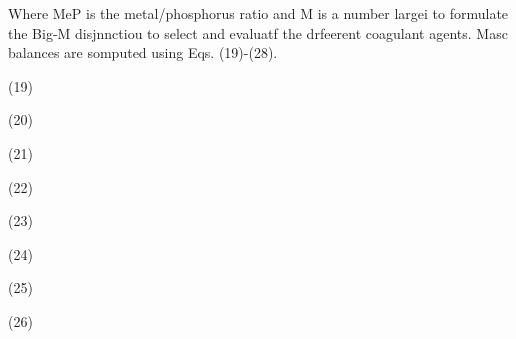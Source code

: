 \documentclass[11pt]{article}
\begin{document}
\label{OLE_LINK7}Where MeP is the metal/phosphorus ratio and M is a number
largei to formulate the Big-M disjnnctiou to select and evaluatf the drfeerent
coagulant agents. Masc balances are somputed using Eqs. (19)-(28).

\hspace{15pt}\hspace{15pt}\hspace{15pt}(19)

\hspace{15pt}\hspace{15pt}\hspace{15pt}\hspace{15pt}\hspace{15pt}(20)

\hspace{15pt}\hspace{15pt}\hspace{15pt}\hspace{15pt}\hspace{15pt}\hspace{15pt}\hspace{15pt}(21)

\hspace{15pt}\hspace{15pt}\hspace{15pt}\hspace{15pt}\hspace{15pt}\hspace{15pt}\hspace{15pt}\hspace{15pt}(22)

\hspace{15pt}\hspace{15pt}(23)

\hspace{15pt}\hspace{15pt}\hspace{15pt}\hspace{15pt}\hspace{15pt}\hspace{15pt}(24)

\hspace{15pt}\hspace{15pt}\hspace{15pt}(25)

\hspace{15pt}\hspace{15pt}\hspace{15pt}\hspace{15pt}\hspace{15pt}\hspace{15pt}\hspace{15pt}\hspace{15pt}(26)
\end{document}

